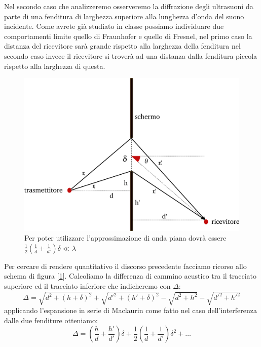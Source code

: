 \documentclass[a4paper,10pt,oneside]{article}
\begin{document}
Nel secondo caso che analizzeremo  osserveremo la diffrazione degli ultrasuoni da parte di una fenditura di larghezza superiore alla lunghezza d'onda del suono incidente. Come avrete già studiato in classe possiamo individuare due comportamenti limite quello di Fraunhofer e quello di Fresnel, nel primo caso la distanza del ricevitore sarà grande rispetto alla larghezza della fenditura nel secondo caso invece il ricevitore si troverà ad una distanza dalla fenditura piccola rispetto alla larghezza di questa.
\begin{figure}[H]
 \centering
 \includegraphics[width=\textwidth]{../Immagini/fraun.png}
 \caption{Per poter utilizzare l'approssimazione di onda piana dovrà essere $\frac 1 2(\frac 1 d+\frac{1}{d'})\delta \ll\lambda$}
 \label{fig:fraunuh}
\end{figure}
Per cercare di rendere quantitativo il discorso precedente facciamo ricorso allo schema di figura [\ref{fig:fraunuh}].
Calcoliamo la differenza di cammino acustico tra il tracciato superiore ed il tracciato inferiore che indicheremo con $\Delta$:
\begin{equation}
\Delta=\sqrt{d^2+(h+\delta)^2}+\sqrt{d'^2+(h'+\delta)^2}-\sqrt{d^2+h^2}-\sqrt{d'^2+h'^2} 
\end{equation}
applicando l'espansione in serie di Maclaurin come fatto nel caso dell'interferenza dalle due fenditure otteniamo:
\begin{equation}
 \Delta=\left(\frac h d+ \frac{h'}{d'}\right)\delta +\frac 1 2 \left(\frac{1}{d}+\frac{1}{d'}\right)\delta^2+\ldots
\end{equation}
\end{document}
